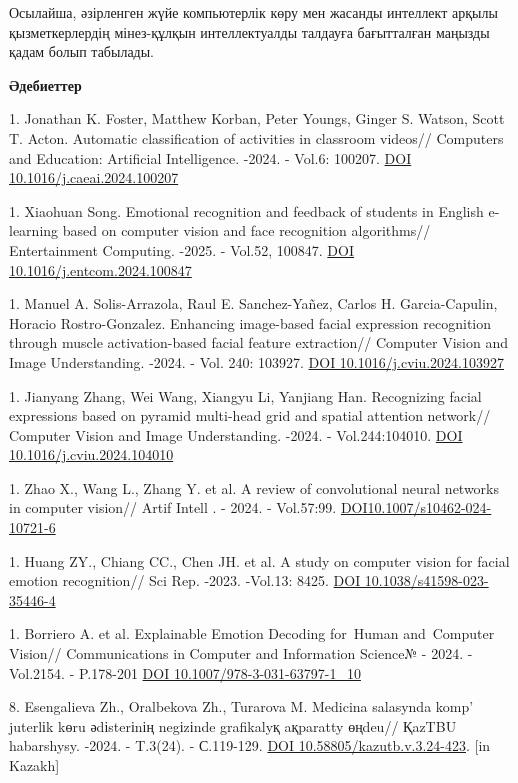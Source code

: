 Осылайша, әзірленген жүйе компьютерлік көру мен жасанды интеллект арқылы
қызметкерлердің мінез-құлқын интеллектуалды талдауға бағытталған маңызды
қадам болып табылады.

{\bfseries Әдебиеттер}


1. Jonathan K. Foster, Matthew Korban, Peter Youngs, Ginger S. Watson,
Scott T. Acton. Automatic classification of activities in classroom
videos// Computers and Education: Artificial Intelligence. -2024. -
Vol.6: 100207. \href{https://doi.org/10.1016/j.caeai.2024.100207}{DOI
10.1016/j.caeai.2024.100207}

1. Xiaohuan Song. Emotional recognition and feedback of students in
English e-learning based on computer vision and face recognition
algorithms// Entertainment Computing. -2025. - Vol.52, 100847.
\href{https://doi.org/10.1016/j.entcom.2024.100847}{DOI
10.1016/j.entcom.2024.100847}

1. Manuel A. Solis-Arrazola, Raul E. Sanchez-Yañez, Carlos H.
Garcia-Capulin, Horacio Rostro-Gonzalez. Enhancing image-based facial
expression recognition through muscle activation-based facial feature
extraction// Computer Vision and Image Understanding. -2024. - Vol.
240: 103927. \href{https://doi.org/10.1016/j.cviu.2024.103927}{DOI
10.1016/j.cviu.2024.103927}

1. Jianyang Zhang, Wei Wang, Xiangyu Li, Yanjiang Han. Recognizing facial
expressions based on pyramid multi-head grid and spatial attention
network// Computer Vision and Image Understanding. -2024. -
Vol.244:104010. \href{https://doi.org/10.1016/j.cviu.2024.104010}{DOI
10.1016/j.cviu.2024.104010}

1. Zhao X., Wang L., Zhang Y. et al. A review of convolutional neural
networks in computer vision// Artif Intell . - 2024. - Vol.57:99.
\href{https://doi.org/10.1007/s10462-024-10721-6}{DOI10.1007/s10462-024-10721-6}

1. Huang ZY., Chiang CC., Chen JH. et al. A study on computer vision for
facial emotion recognition// Sci Rep. -2023. -Vol.13: 8425.
\href{https://doi.org/10.1038/s41598-023-35446-4}{DOI
10.1038/s41598-023-35446-4}

1. Borriero A. et al. Explainable Emotion Decoding for~Human and~Computer
Vision// Communications in Computer and Information Science№ - 2024. -
Vol.2154. - P.178-201
\href{https://doi.org/10.1007/978-3-031-63797-1_10}{DOI
10.1007/978-3-031-63797-1\_10}

8. Esengalieva Zh., Oralbekova Zh., Turarova M. Medicina salasynda
komp' juterlіk kөru әdіsterіnің negіzіnde grafikalyқ
aқparatty өңdeu// ҚazTBU habarshysy. -2024. - T.3(24). - С.119-129.
\href{https://doi.org/10.58805/kazutb.v.3.24-423}{DOI
10.58805/kazutb.v.3.24-423}. {[}in Kazakh{]}

